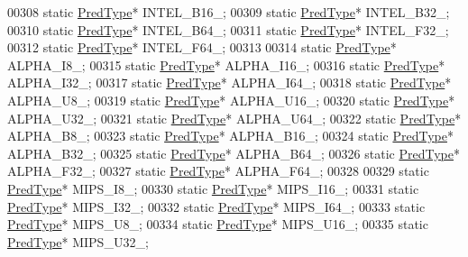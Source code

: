 \begin{DoxyCode}
00308         \textcolor{keyword}{static} \hyperlink{class_h5_1_1_pred_type}{PredType}* INTEL\_B16\_;
00309         \textcolor{keyword}{static} \hyperlink{class_h5_1_1_pred_type}{PredType}* INTEL\_B32\_;
00310         \textcolor{keyword}{static} \hyperlink{class_h5_1_1_pred_type}{PredType}* INTEL\_B64\_;
00311         \textcolor{keyword}{static} \hyperlink{class_h5_1_1_pred_type}{PredType}* INTEL\_F32\_;
00312         \textcolor{keyword}{static} \hyperlink{class_h5_1_1_pred_type}{PredType}* INTEL\_F64\_;
00313 
00314         \textcolor{keyword}{static} \hyperlink{class_h5_1_1_pred_type}{PredType}* ALPHA\_I8\_;
00315         \textcolor{keyword}{static} \hyperlink{class_h5_1_1_pred_type}{PredType}* ALPHA\_I16\_;
00316         \textcolor{keyword}{static} \hyperlink{class_h5_1_1_pred_type}{PredType}* ALPHA\_I32\_;
00317         \textcolor{keyword}{static} \hyperlink{class_h5_1_1_pred_type}{PredType}* ALPHA\_I64\_;
00318         \textcolor{keyword}{static} \hyperlink{class_h5_1_1_pred_type}{PredType}* ALPHA\_U8\_;
00319         \textcolor{keyword}{static} \hyperlink{class_h5_1_1_pred_type}{PredType}* ALPHA\_U16\_;
00320         \textcolor{keyword}{static} \hyperlink{class_h5_1_1_pred_type}{PredType}* ALPHA\_U32\_;
00321         \textcolor{keyword}{static} \hyperlink{class_h5_1_1_pred_type}{PredType}* ALPHA\_U64\_;
00322         \textcolor{keyword}{static} \hyperlink{class_h5_1_1_pred_type}{PredType}* ALPHA\_B8\_;
00323         \textcolor{keyword}{static} \hyperlink{class_h5_1_1_pred_type}{PredType}* ALPHA\_B16\_;
00324         \textcolor{keyword}{static} \hyperlink{class_h5_1_1_pred_type}{PredType}* ALPHA\_B32\_;
00325         \textcolor{keyword}{static} \hyperlink{class_h5_1_1_pred_type}{PredType}* ALPHA\_B64\_;
00326         \textcolor{keyword}{static} \hyperlink{class_h5_1_1_pred_type}{PredType}* ALPHA\_F32\_;
00327         \textcolor{keyword}{static} \hyperlink{class_h5_1_1_pred_type}{PredType}* ALPHA\_F64\_;
00328 
00329         \textcolor{keyword}{static} \hyperlink{class_h5_1_1_pred_type}{PredType}* MIPS\_I8\_;
00330         \textcolor{keyword}{static} \hyperlink{class_h5_1_1_pred_type}{PredType}* MIPS\_I16\_;
00331         \textcolor{keyword}{static} \hyperlink{class_h5_1_1_pred_type}{PredType}* MIPS\_I32\_;
00332         \textcolor{keyword}{static} \hyperlink{class_h5_1_1_pred_type}{PredType}* MIPS\_I64\_;
00333         \textcolor{keyword}{static} \hyperlink{class_h5_1_1_pred_type}{PredType}* MIPS\_U8\_;
00334         \textcolor{keyword}{static} \hyperlink{class_h5_1_1_pred_type}{PredType}* MIPS\_U16\_;
00335         \textcolor{keyword}{static} \hyperlink{class_h5_1_1_pred_type}{PredType}* MIPS\_U32\_;

\end{DoxyCode}
